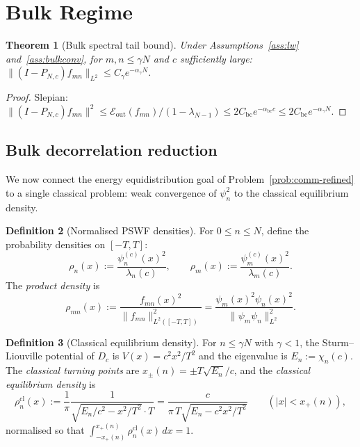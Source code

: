 \documentclass[12pt,a4paper]{amsart}
\newtheorem{theorem}{Theorem}[section]
\theoremstyle{definition}
\newtheorem{definition}[theorem]{Definition}
\newcommand{\PN}{P_{N,c}}
\newcommand{\Eout}{\mathcal{E}_{\mathrm{out}}}
\newcommand{\rhom}{\rho_m}
\newcommand{\rhon}{\rho_n}
\newcommand{\rhocl}{\rho_n^{\mathrm{cl}}}
\begin{document}
\section{Bulk Regime}\label{sec:bulk}

\begin{theorem}[Bulk spectral tail bound]\label{thm:bulk}
Under Assumptions~\ref{ass:lw} and~\ref{ass:bulkconv},
for $m,n \le \gamma N$ and $c$ sufficiently large:
$\|(I-\PN)f_{mn}\|_{L^2} \le C_\gamma e^{-\alpha_\gamma N}$.
\end{theorem}

\begin{proof}
Slepian: $\|(I-\PN)f_{mn}\|^2 \le \Eout(f_{mn})/(1-\lambda_{N-1})
\le 2C_{\mathrm{bc}}e^{-\alpha_{\mathrm{bc}}c}
\le 2C_{\mathrm{bc}}e^{-\alpha_\gamma N}$.
\end{proof}

\subsection{Bulk decorrelation reduction}\label{ssec:bulk-reduction}

We now connect the energy equidistribution goal of
Problem~\ref{prob:comm-refined} to a single classical problem:
weak convergence of $\psi_n^2$ to the classical equilibrium density.

\begin{definition}[Normalised PSWF densities]\label{def:densities}
For $0 \le n \le N$, define the probability densities on $[-T,T]$:
\[
  \rhon(x) := \frac{\psi_n^{(c)}(x)^2}{\lambda_n(c)}, \qquad
  \rhom(x) := \frac{\psi_m^{(c)}(x)^2}{\lambda_m(c)}.
\]
The \emph{product density} is
\[
  \rho_{mn}(x)
  := \frac{f_{mn}(x)^2}{\|f_{mn}\|_{L^2([-T,T])}^2}
  = \frac{\psi_m(x)^2\psi_n(x)^2}{\|\psi_m\psi_n\|_{L^2}^2}.
\]
\end{definition}

\begin{definition}[Classical equilibrium density]\label{def:classical}
For $n \le \gamma N$ with $\gamma < 1$, the Sturm--Liouville
potential of $D_c$ is $V(x) = c^2x^2/T^2$ and the eigenvalue is
$E_n := \chi_n(c)$.
The \emph{classical turning points} are
$x_{\pm}(n) = \pm T\sqrt{E_n}/c$,
and the \emph{classical equilibrium density} is
\begin{equation}\label{eq:classical-density}
  \rhocl(x)
  := \frac{1}{\pi}\frac{1}{\sqrt{E_n/c^2 - x^2/T^2}\cdot T}
  = \frac{c}{\pi\,T\sqrt{E_n - c^2x^2/T^2}}
  \qquad (|x| < x_+(n)),
\end{equation}
normalised so that $\int_{-x_+(n)}^{x_+(n)}\rhocl(x)\,dx = 1$.
\end{definition}
\end{document}
